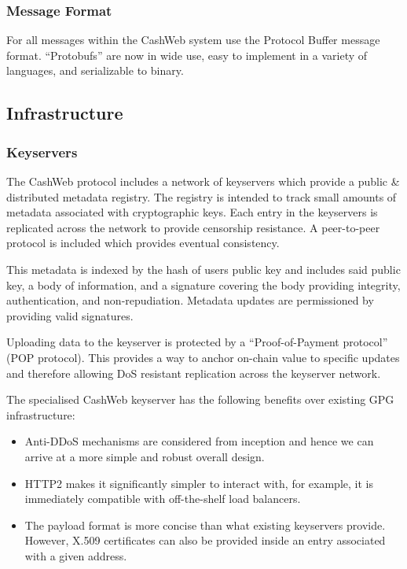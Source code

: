 \documentclass{article}
\begin{document}
\subsubsection{Message Format}

For all messages within the CashWeb system use the Protocol Buffer\cite{protobufs} message format. ``Protobufs'' are now in wide use, easy to implement in a variety of languages, and serializable to binary.

\subsection{Infrastructure}

\subsubsection{Keyservers}

The CashWeb protocol includes a network of keyservers which provide a public \& distributed metadata registry. The registry is intended to track small amounts of metadata associated with cryptographic keys. Each entry in the keyservers is replicated across the network to provide censorship resistance. A peer-to-peer protocol is included which provides eventual consistency.

This metadata is indexed by the hash of users public key and includes said public key, a body of information, and a signature covering the body providing integrity, authentication, and non-repudiation. Metadata updates are permissioned by providing valid signatures.

Uploading data to the keyserver is protected by a ``Proof-of-Payment protocol'' (POP protocol). This provides a way to anchor on-chain value to specific updates and therefore allowing DoS resistant replication across the keyserver network.

The specialised CashWeb keyserver has the following benefits over existing GPG infrastructure:
\begin{itemize}
  \item Anti-DDoS mechanisms are considered from inception and hence we can arrive at a more simple and robust overall design.
  \item HTTP2 makes it significantly simpler to interact with, for example, it is immediately compatible with off-the-shelf load balancers.
  \item The payload format is more concise than what existing keyservers provide. However, X.509 certificates can also be provided inside an entry associated with a given address.
\end{itemize}
\end{document}

